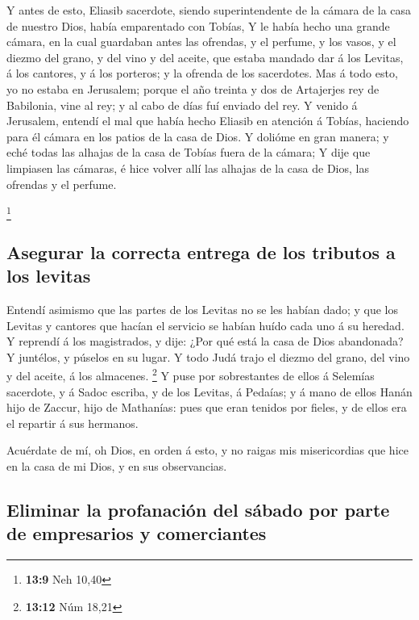  Y antes de esto, Eliasib sacerdote, siendo superintendente
de la cámara de la casa de nuestro Dios, había emparentado con Tobías,
 Y le había hecho una grande cámara, en la cual guardaban
antes las ofrendas, y el perfume, y los vasos, y el diezmo del grano, y
del vino y del aceite, que estaba mandado dar á los Levitas, á los
cantores, y á los porteros; y la ofrenda de los sacerdotes. 
Mas á todo esto, yo no estaba en Jerusalem; porque el año treinta y dos
de Artajerjes rey de Babilonia, vine al rey; y al cabo de días fuí
enviado del rey.  Y venido á Jerusalem, entendí el mal que
había hecho Eliasib en atención á Tobías, haciendo para él cámara en los
patios de la casa de Dios.  Y dolióme en gran manera; y eché
todas las alhajas de la casa de Tobías fuera de la cámara; 
Y dije que limpiasen las cámaras, é hice volver allí las alhajas de la
casa de Dios, las ofrendas y el perfume.

\footnote{\textbf{13:9} Neh 10,40}

\hypertarget{asegurar-la-correcta-entrega-de-los-tributos-a-los-levitas}{%
\subsection{Asegurar la correcta entrega de los tributos a los
levitas}\label{asegurar-la-correcta-entrega-de-los-tributos-a-los-levitas}}

 Entendí asimismo que las partes de los Levitas no se les
habían dado; y que los Levitas y cantores que hacían el servicio se
habían huído cada uno á su heredad.  Y reprendí á los
magistrados, y dije: ¿Por qué está la casa de Dios abandonada? Y
juntélos, y púselos en su lugar.  Y todo Judá trajo el
diezmo del grano, del vino y del aceite, á los almacenes. \footnote{\textbf{13:12}
  Núm 18,21}  Y puse por sobrestantes de ellos á Selemías
sacerdote, y á Sadoc escriba, y de los Levitas, á Pedaías; y á mano de
ellos Hanán hijo de Zaccur, hijo de Mathanías: pues que eran tenidos por
fieles, y de ellos era el repartir á sus hermanos.

 Acuérdate de mí, oh Dios, en orden á esto, y no raigas mis
misericordias que hice en la casa de mi Dios, y en sus observancias.

\hypertarget{eliminar-la-profanaciuxf3n-del-suxe1bado-por-parte-de-empresarios-y-comerciantes}{%
\subsection{Eliminar la profanación del sábado por parte de empresarios
y
comerciantes}\label{eliminar-la-profanaciuxf3n-del-suxe1bado-por-parte-de-empresarios-y-comerciantes}}

